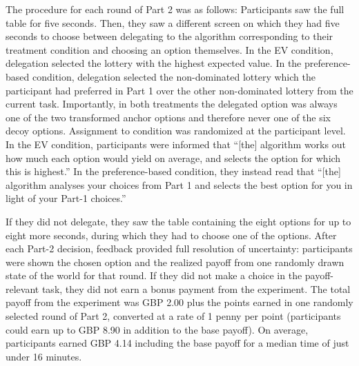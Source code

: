 \documentclass[a4paper, 12pt, fleqn]{article}
\theoremstyle{definition}
\begin{document}
The procedure for each round of Part 2 was as follows: Participants saw the full table for five seconds. Then, they saw a different screen on which they had five seconds to choose between delegating to the algorithm corresponding to their treatment condition and choosing an option themselves.
In the EV condition, delegation selected the lottery with the highest expected value. In the preference-based condition, delegation selected the non-dominated lottery which the participant had preferred in Part 1 over the other non-dominated lottery from the current task. Importantly, in both treatments the delegated option was always one of the two transformed anchor options and therefore never one of the six decoy options. Assignment to condition was randomized at the participant level. In the EV condition, participants were informed that ``[the] algorithm works out how much each option would yield on average, and selects the option for which this is highest.'' In the preference-based condition, they instead read that ``[the] algorithm analyses your choices from Part 1 and selects the best option for you in light of your Part-1 choices.''

If they did not delegate, they saw the table containing the eight options for up to eight more seconds, during which they had to choose one of the options. After each Part-2 decision, feedback provided full resolution of uncertainty: participants were shown the chosen option and the realized payoff from one randomly drawn state of the world for that round. If they did not make a choice in the payoff-relevant task, they did not earn a bonus payment from the experiment. The total payoff from the experiment was GBP 2.00 plus the points earned in one randomly selected round of Part 2, converted at a rate of 1 penny per point (participants could earn up to GBP 8.90 in addition to the base payoff). On average, participants earned GBP 4.14 including the base payoff for a median time of just under 16 minutes.
\end{document}
